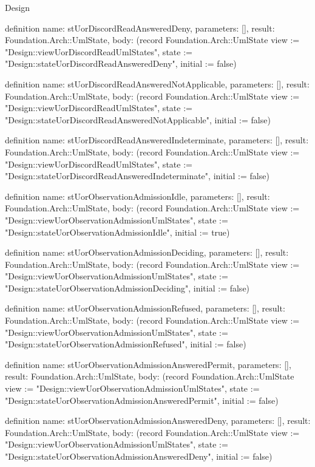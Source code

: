 \begin{lexlean}{Design}
\begin{semanticmodule}
definition{
  name: stUorDiscordReadAnsweredDeny,
  parameters: [],
  result: Foundation.Arch::UmlState,
  body: (record Foundation.Arch::UmlState {view := "Design::viewUorDiscordReadUmlStates", state := "Design::stateUorDiscordReadAnsweredDeny", initial := false})
}

definition{
  name: stUorDiscordReadAnsweredNotApplicable,
  parameters: [],
  result: Foundation.Arch::UmlState,
  body: (record Foundation.Arch::UmlState {view := "Design::viewUorDiscordReadUmlStates", state := "Design::stateUorDiscordReadAnsweredNotApplicable", initial := false})
}

definition{
  name: stUorDiscordReadAnsweredIndeterminate,
  parameters: [],
  result: Foundation.Arch::UmlState,
  body: (record Foundation.Arch::UmlState {view := "Design::viewUorDiscordReadUmlStates", state := "Design::stateUorDiscordReadAnsweredIndeterminate", initial := false})
}

definition{
  name: stUorObservationAdmissionIdle,
  parameters: [],
  result: Foundation.Arch::UmlState,
  body: (record Foundation.Arch::UmlState {view := "Design::viewUorObservationAdmissionUmlStates", state := "Design::stateUorObservationAdmissionIdle", initial := true})
}

definition{
  name: stUorObservationAdmissionDeciding,
  parameters: [],
  result: Foundation.Arch::UmlState,
  body: (record Foundation.Arch::UmlState {view := "Design::viewUorObservationAdmissionUmlStates", state := "Design::stateUorObservationAdmissionDeciding", initial := false})
}

definition{
  name: stUorObservationAdmissionRefused,
  parameters: [],
  result: Foundation.Arch::UmlState,
  body: (record Foundation.Arch::UmlState {view := "Design::viewUorObservationAdmissionUmlStates", state := "Design::stateUorObservationAdmissionRefused", initial := false})
}

definition{
  name: stUorObservationAdmissionAnsweredPermit,
  parameters: [],
  result: Foundation.Arch::UmlState,
  body: (record Foundation.Arch::UmlState {view := "Design::viewUorObservationAdmissionUmlStates", state := "Design::stateUorObservationAdmissionAnsweredPermit", initial := false})
}

definition{
  name: stUorObservationAdmissionAnsweredDeny,
  parameters: [],
  result: Foundation.Arch::UmlState,
  body: (record Foundation.Arch::UmlState {view := "Design::viewUorObservationAdmissionUmlStates", state := "Design::stateUorObservationAdmissionAnsweredDeny", initial := false})
}


\end{semanticmodule}
\end{lexlean}
